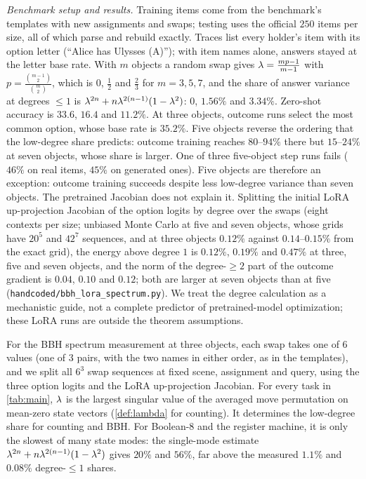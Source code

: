 \noindent\begin{minipage}{\linewidth}
\emph{Benchmark setup and results.} Training items come from the benchmark's templates with new assignments and swaps; testing uses
the official $250$ items per size, all of which parse and rebuild exactly. Traces list every holder's item with its
option letter (``Alice has Ulysses (A)''); with item names alone, answers stayed at the letter base rate. With $m$
objects a random swap gives $\lambda=\frac{mp-1}{m-1}$ with $p=\frac{\binom{m-1}{2}}{\binom{m}{2}}$, which is $0$, $\tfrac{1}{2}$ and $\tfrac{2}{3}$ for $m=3,5,7$, and the
share of answer variance at degrees $\le1$ is $\lambda^{2n}+n\lambda^{2(n-1)}(1-\lambda^2)$: $0$, $1.56\%$ and $3.34\%$. Zero-shot accuracy is
$33.6$, $16.4$ and $11.2\%$. At three objects, outcome runs select the most common option, whose base rate is $35.2\%$.
Five objects reverse the ordering that the low-degree share predicts: outcome training reaches $80$--$94\%$ there but
$15$--$24\%$ at seven objects, whose share is larger. One of three five-object step runs fails ($46\%$ on real items, $45\%$ on
generated ones). Five objects are therefore an exception: outcome training succeeds despite less low-degree variance than seven objects.
The pretrained Jacobian does not explain it. Splitting the initial LoRA up-projection Jacobian of the option logits by degree over the swaps
(eight contexts per size; unbiased Monte Carlo at five and seven objects, whose grids have $20^5$ and $42^7$ sequences, and at three objects
$0.12\%$ against $0.14$--$0.15\%$ from the exact grid), the energy above degree $1$ is $0.12\%$, $0.19\%$ and $0.47\%$ at three, five and seven objects,
and the norm of the degree-$\ge2$ part of the outcome gradient is $0.04$, $0.10$ and $0.12$; both are larger at seven objects than at five
(\texttt{handcoded/bbh\_lora\_spectrum.py}).
We treat the degree calculation as a mechanistic guide, not a complete predictor of pretrained-model optimization; these LoRA runs are outside the theorem assumptions.
\end{minipage}






For the BBH spectrum measurement at three objects, each swap takes one of $6$ values (one of $3$ pairs, with the two names in either order, as in the
templates), and we split all $6^3$ swap sequences at fixed scene, assignment and query, using the three option logits and the LoRA up-projection Jacobian. For every task in \cref{tab:main}, $\lambda$ is the largest singular value of the averaged
move permutation on mean-zero state vectors (\cref{def:lambda} for counting).
It determines the low-degree share for counting and BBH. For Boolean-8 and the register machine, it is only the slowest of many state modes:
the single-mode estimate $\lambda^{2n}+n\lambda^{2(n-1)}(1-\lambda^2)$ gives $20\%$ and $56\%$, far above the measured
$1.1\%$ and $0.08\%$ degree-$\le1$ shares.

